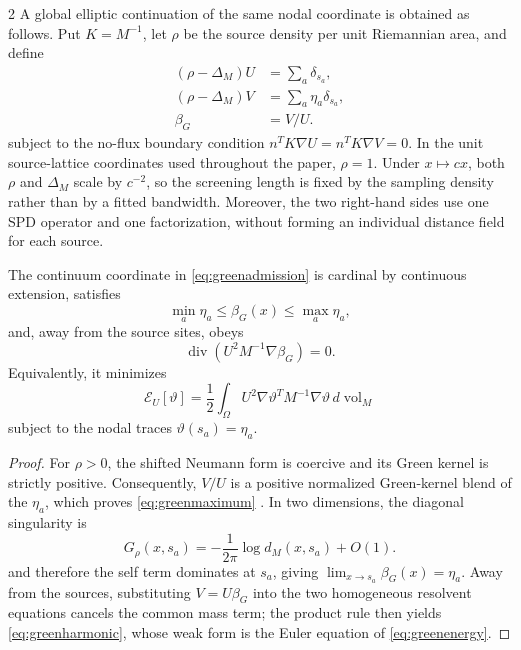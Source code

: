 \begin{multicols}{2}
A global elliptic continuation of the same nodal coordinate is obtained as
follows. Put \(K=M^{-1}\), let \(\rho\) be the source density per unit
Riemannian area, and define
\begin{equation}
 \begin{aligned}
  (\rho-\Delta_M)U&=\sum_a\delta_{s_a},\\
  (\rho-\Delta_M)V&=\sum_a\eta_a\delta_{s_a},\\
  \beta_G&=V/U.
 \end{aligned}
 \label{eq:greenadmission}
\end{equation}
subject to the no-flux boundary condition
\(n^TK\nabla U=n^TK\nabla V=0\). In the unit source-lattice coordinates used
throughout the paper, \(\rho=1\). Under \(x\mapsto cx\), both \(\rho\) and
\(\Delta_M\) scale by \(c^{-2}\), so the screening length is fixed by the
sampling density rather than by a fitted bandwidth. Moreover, the two
right-hand sides use one SPD operator and one factorization, without forming
an individual distance field for each source.

\begin{proposition}
The continuum coordinate in \eqref{eq:greenadmission} is cardinal by
continuous extension, satisfies
\begin{equation}
 \min_a\eta_a\leq\beta_G(x)\leq\max_a\eta_a,
 \label{eq:greenmaximum}
\end{equation}
and, away from the source sites, obeys
\begin{equation}
 \operatorname{div}\!\left(U^2M^{-1}\nabla\beta_G\right)=0.
 \label{eq:greenharmonic}
\end{equation}
Equivalently, it minimizes
\begin{equation}
 \mathcal E_U[\vartheta]
 =\frac12\int_\Omega U^2\nabla\vartheta^TM^{-1}\nabla\vartheta\,
 d\operatorname{vol}_M
 \label{eq:greenenergy}
\end{equation}
subject to the nodal traces \(\vartheta(s_a)=\eta_a\).
\end{proposition}

\begin{proof}
For \(\rho>0\), the shifted Neumann form is coercive and its Green kernel is
strictly positive. Consequently, \(V/U\) is a positive normalized
Green-kernel blend of the \(\eta_a\), which proves
\eqref{eq:greenmaximum} \cite{gilbargtrudinger2001}. In two dimensions, the
diagonal singularity is
\begin{equation}
 G_\rho(x,s_a)=-\frac{1}{2\pi}\log d_M(x,s_a)+O(1).
 \label{eq:greensingu}
\end{equation}
and therefore the self term dominates at \(s_a\), giving
\(\lim_{x\to s_a}\beta_G(x)=\eta_a\). Away from the sources, substituting
\(V=U\beta_G\) into the two homogeneous resolvent equations cancels the
common mass term; the product rule then yields \eqref{eq:greenharmonic}, whose
weak form is the Euler equation of \eqref{eq:greenenergy}.
\end{proof}


\end{multicols}
